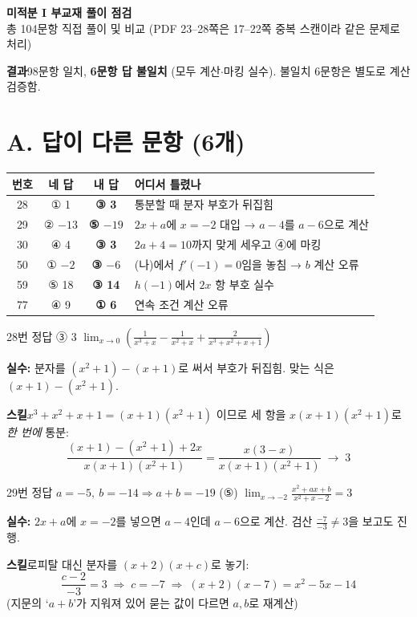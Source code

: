 \documentclass[11pt,a4paper]{article}
\newcommand{\ok}[1]{\textcolor{good}{\textbf{#1}}}
\newcommand{\no}[1]{\textcolor{bad}{#1}}
\newcommand{\tip}{\textsf{\textbf{\color{main}스킬}}\;}
\begin{document}
{\sffamily\bfseries\huge 미적분 I 부교재 풀이 점검}\\[4pt]
{\color{gray} 총 104문항 직접 풀이 및 비교 \quad(PDF 23--28쪽은 17--22쪽 중복 스캔이라 같은 문제로 처리)}

\begin{tcolorbox}[colback=soft,colframe=main,boxrule=0.6pt,arc=2pt]
\textbf{결과}\quad 98문항 일치,\; \no{\textbf{6문항 답 불일치}} (모두 계산$\cdot$마킹 실수).
불일치 6문항은 별도로 계산 검증함.
\end{tcolorbox}

\section{A. 답이 다른 문항 (6개)}

\begin{center}
\renewcommand{\arraystretch}{1.35}
\begin{tabularx}{\textwidth}{c c c X}
\toprule
\textsf{번호} & \textsf{네 답} & \textsf{내 답} & \textsf{어디서 틀렸나}\\
\midrule
28 & \no{① 1} & \ok{③ 3} & 통분할 때 분자 부호가 뒤집힘\\
29 & \no{② $-13$} & \ok{⑤ $-19$} & $2x+a$에 $x=-2$ 대입 → $a-4$를 $a-6$으로 계산\\
30 & \no{④ 4} & \ok{③ 3} & $2a+4=10$까지 맞게 세우고 ④에 마킹\\
50 & \no{① $-2$} & \ok{③ $-6$} & (나)에서 $f'(-1)=0$임을 놓침 → $b$ 계산 오류\\
59 & \no{⑤ 18} & \ok{③ 14} & $h(-1)$에서 $2x$ 항 부호 실수\\
77 & \no{④ 9} & \ok{① 6} & 연속 조건 계산 오류\\
\bottomrule
\end{tabularx}
\end{center}

\begin{wrong}{28번 \quad 정답 ③ 3}
$\displaystyle\lim_{x\to0}\left(\frac{1}{x^3+x}-\frac{1}{x^2+x}+\frac{2}{x^3+x^2+x+1}\right)$

\textbf{실수:} 분자를 $(x^2+1)-(x+1)$로 써서 부호가 뒤집힘. 맞는 식은 $(x+1)-(x^2+1)$.

\tip $x^3+x^2+x+1=(x+1)(x^2+1)$ 이므로 세 항을 $x(x+1)(x^2+1)$로 \emph{한 번에} 통분:
\[
\frac{(x+1)-(x^2+1)+2x}{x(x+1)(x^2+1)}=\frac{x(3-x)}{x(x+1)(x^2+1)}\;\longrightarrow\;3
\]
\end{wrong}

\begin{wrong}{29번 \quad 정답 $a=-5,\ b=-14 \Rightarrow a+b=-19$ (⑤)}
$\displaystyle\lim_{x\to-2}\frac{x^2+ax+b}{x^2+x-2}=3$

\textbf{실수:} $2x+a$에 $x=-2$를 넣으면 $a-4$인데 $a-6$으로 계산. 검산 $\frac{-7}{-3}\neq3$을 보고도 진행.

\tip 로피탈 대신 분자를 $(x+2)(x+c)$로 놓기:
\[
\frac{c-2}{-3}=3\;\Rightarrow\;c=-7\;\Rightarrow\;(x+2)(x-7)=x^2-5x-14
\]
{\small\color{gray}(지문의 `$a+b$'가 지워져 있어 묻는 값이 다르면 $a,b$로 재계산)}
\end{wrong}
\end{document}
